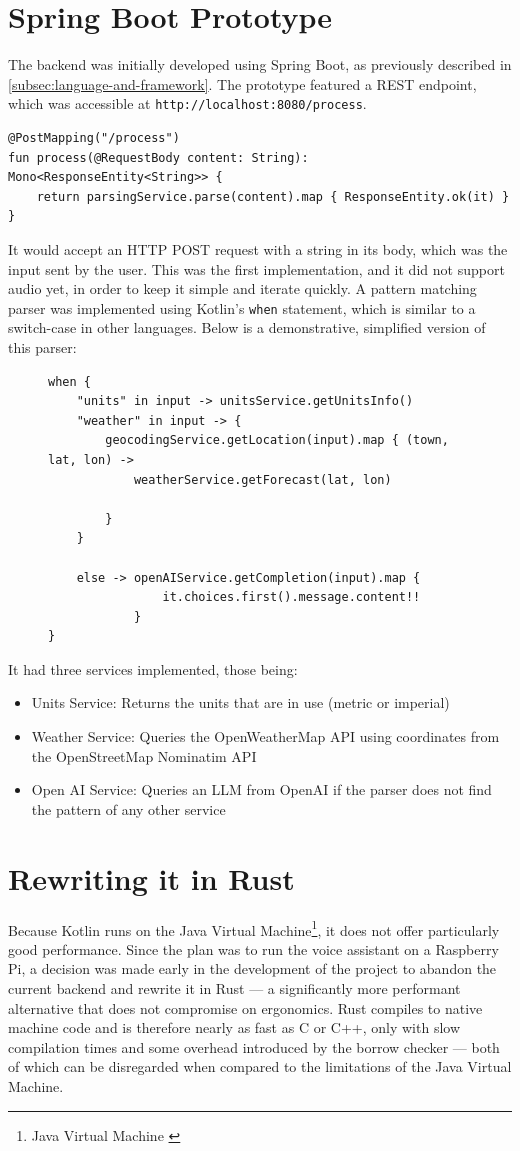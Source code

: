 \section{Spring Boot Prototype}
The backend was initially developed using Spring Boot, as previously described in \ref{subsec:language-and-framework}.
The prototype featured a REST endpoint, which was accessible at \texttt{http://localhost:8080/process}.
\begin{verbatim}
@PostMapping("/process")
fun process(@RequestBody content: String): Mono<ResponseEntity<String>> {
    return parsingService.parse(content).map { ResponseEntity.ok(it) }
}
\end{verbatim}
It would accept an HTTP POST request with a string in its body, which was the input sent by the user.
This was the first implementation, and it did not support audio yet, in order to keep it simple and iterate quickly.
A pattern matching parser was implemented using Kotlin's \texttt{when} statement, which is similar to a switch-case in other languages.
Below is a demonstrative, simplified version of this parser:
\begin{figure}[H]
\begin{verbatim}
when {
    "units" in input -> unitsService.getUnitsInfo()
    "weather" in input -> {
        geocodingService.getLocation(input).map { (town, lat, lon) ->
            weatherService.getForecast(lat, lon)

        }
    }

    else -> openAIService.getCompletion(input).map {
                it.choices.first().message.content!!
            }
}
\end{verbatim}
\end{figure}
It had three services implemented, those being:
\begin{itemize}
  \item Units Service: Returns the units that are in use (metric or imperial)
  \item Weather Service: Queries the OpenWeatherMap API using coordinates from the OpenStreetMap Nominatim API
  \item Open AI Service: Queries an LLM from OpenAI if the parser does not find the pattern of any other service
\end{itemize}

\section{Rewriting it in Rust}
Because Kotlin runs on the Java Virtual Machine\footnote{Java Virtual Machine \cite{jvm}},
it does not offer particularly good performance.
Since the plan was to run the voice assistant on a Raspberry Pi,
a decision was made early in the development of the project
to abandon the current backend and rewrite it in Rust ---
a significantly more performant alternative that does not compromise on ergonomics.
Rust compiles to native machine code and is therefore nearly as fast as C or C++,
only with slow compilation times and some overhead introduced by the borrow checker ---
both of which can be disregarded when compared to the limitations of the Java Virtual Machine.

